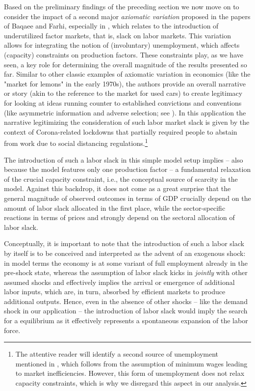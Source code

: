 \documentclass{article}
\begin{document}
Based on the preliminary findings of the preceding section we now move on to consider the impact of a second major \textit{axiomatic variation} \citep{Kapeller.2013} proposed in the papers of Baqaee and Farhi, especially in \citet{Baqaee.2021,BF2022}, which relates to the introduction of underutilized factor markets, that is, slack on labor markets. This variation allows for integrating the notion of (involuntary) unemployment, which affects (capacity) constraints on production factors. These constraints play, as we have seen, a key role for determining the overall magnitude of the results presented so far. Similar to other classic examples of axiomatic variation in economics (like the "market for lemons" in the early 1970s), the authors provide an overall narrative or story (akin to the reference to the market for used cars) to create legitimacy for looking at ideas running counter to established convictions and conventions (like asymmetric information and adverse selection; see \cite{Akerlof.1970}). In this application the narrative legitimizing the consideration of such labor market slack is given by the context of Corona-related lockdowns that partially required people to abstain from work due to social distancing regulations.\footnote{The attentive reader will identify a second source of unemployment mentioned in \citet{BF2022}, which follows from the assumption of minimum wages leading to market inefficiencies. However, this form of unemployment does not relax capacity constraints, which is why we disregard this aspect in our analysis.}

The introduction of such a labor slack in this simple model setup implies -- also because the model features only one production factor -- a fundamental relaxation of the crucial capacity constraint, i.e., the conceptual source of scarcity in the model. Against this backdrop, it does not come as a great surprise that the general magnitude of observed outcomes in terms of GDP crucially depend on the amount of labor slack allocated in the first place, while the sector-specific reactions in terms of prices and strongly depend on the sectoral allocation of labor slack. 

Conceptually, it is important to note that the introduction of such a labor slack by itself is to be conceived and interpreted as the advent of an exogenous shock: in model terms the economy is at some variant of full employment already in the pre-shock state, whereas the assumption of labor slack kicks in \textit{jointly} with other assumed shocks and effectively implies the arrival or emergence of additional labor inputs, which are, in turn, absorbed by efficient markets to produce additional outputs. Hence, even in the absence of other shocks -- like the demand shock in our application -- the introduction of labor slack would imply the search for a equilibrium as it effectively represents a spontaneous expansion of the labor force.
\end{document}
